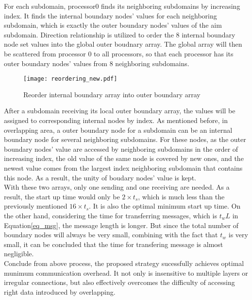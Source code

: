 \documentclass{sig-alternate}
\begin{document}
	For each subdomain, processor0 finds its neighboring subdomains by increasing index. It finds the internal boundary 
	nodes' values for each neighboring subdomain, which is exactly the outer boundary nodes' values of the aim subdomain. Direction 
	relationship is utilized to order the 8 internal boundary node set values into the global outer boudnary array. The 
	global array will then be scattered from processor 0 to all processors, so that each processor has its outer boundary nodes'
	values from 8 neighboring subdomains.\\ 
	\begin{figure}[htbp]
	  \centering
	  \texttt{[image: reordering\_new.pdf]}
	  \caption{Reorder internal boundary array into outer boundary array}
	  \label{Fig4}
	\end{figure}

	After a subdomain receiving its local outer boundary array, the values will be assigned to corresponding internal nodes by 
	index. As mentioned before, in overlapping area, a outer boundary node for a subdomain can be an internal boundary node for 
	several neighboring subdomains. For these nodes, as the outer boundary nodes' value are accessed by neighboring subdomains 
	in the order of increasing index, the old value of the same node is covered by new ones, and the newest value
	comes from the largest index neighboring subdomain that contains this node. As a result, the unity of boudary nodes' value 
	is kept.\\  
	
	With these two arrays, only one sending and one receiving are needed. As a result, the start up time would only be $2\times 
	t_s$, which is much less than the previously mentioned $16\times t_s$. It is also the optimal minimum start up time. On the other
	hand, considering the time for transferring messages, which is $t_wL$ in Equation\eqref{eq_msg}, the message length is longer.
	But since the total number of boundary nodes will always be very small, combining with the fact that $t_w$ is very small, 
	it can be concluded that the time for transfering message is almost negligible.\\ 

	Conclude from above process, the proposed strategy sucessfully achieves optimal munimum communication overhead. It  
	not only is insensitive to multiple layers or irregular connections, but also effectively overcomes the difficulty of 
	accessing right data introduced by overlapping.\\
	
\end{document}
